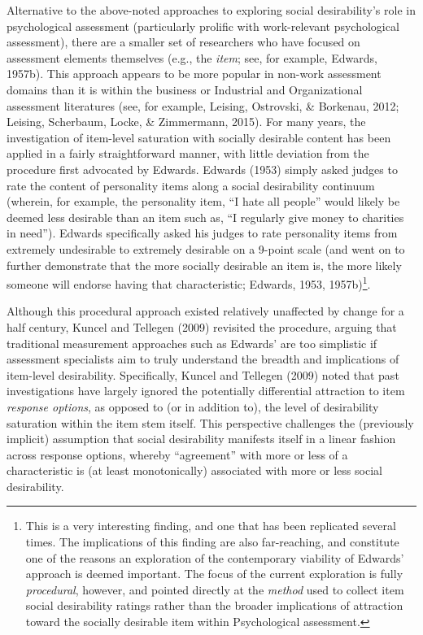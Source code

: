 \documentclass[
  english,
  ,jou]{apa6}
\begin{document}
Alternative to the above-noted approaches to exploring social desirability's role in psychological assessment (particularly prolific with work-relevant psychological assessment), there are a smaller set of researchers who have focused on assessment elements themselves (e.g., the \emph{item}; see, for example, Edwards, 1957b). This approach appears to be more popular in non-work assessment domains than it is within the business or Industrial and Organizational assessment literatures (see, for example, Leising, Ostrovski, \& Borkenau, 2012; Leising, Scherbaum, Locke, \& Zimmermann, 2015). For many years, the investigation of item-level saturation with socially desirable content has been applied in a fairly straightforward manner, with little deviation from the procedure first advocated by Edwards. Edwards (1953) simply asked judges to rate the content of personality items along a social desirability continuum (wherein, for example, the personality item, \enquote{I hate all people} would likely be deemed less desirable than an item such as, \enquote{I regularly give money to charities in need}). Edwards specifically asked his judges to rate personality items from extremely undesirable to extremely desirable on a 9-point scale (and went on to further demonstrate that the more socially desirable an item is, the more likely someone will endorse having that characteristic; Edwards, 1953, 1957b)\footnote{This is a very interesting finding, and one that has been replicated several times. The implications of this finding are also far-reaching, and constitute one of the reasons an exploration of the contemporary viability of Edwards' approach is deemed important. The focus of the current exploration is fully \emph{procedural}, however, and pointed directly at the \emph{method} used to collect item social desirability ratings rather than the broader implications of attraction toward the socially desirable item within Psychological assessment.}.

Although this procedural approach existed relatively unaffected by change for a half century, Kuncel and Tellegen (2009) revisited the procedure, arguing that traditional measurement approaches such as Edwards' are too simplistic if assessment specialists aim to truly understand the breadth and implications of item-level desirability. Specifically, Kuncel and Tellegen (2009) noted that past investigations have largely ignored the potentially differential attraction to item \emph{response options}, as opposed to (or in addition to), the level of desirability saturation within the item stem itself. This perspective challenges the (previously implicit) assumption that social desirability manifests itself in a linear fashion across response options, whereby \enquote{agreement} with more or less of a characteristic is (at least monotonically) associated with more or less social desirability.
\end{document}
